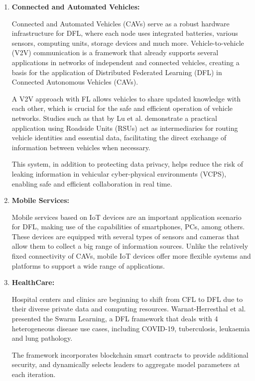 \begin{enumerate}
	\item \textbf{Connected and Automated Vehicles:}
	
	Connected and Automated Vehicles (CAVs) serve as a robust hardware infrastructure for DFL, where each node uses integrated batteries, various sensors, computing units, storage devices and much more. Vehicle-to-vehicle (V2V) communication is a framework that already supports several applications in networks of independent and connected vehicles, creating a basis for the application of Distributed Federated Learning (DFL) in Connected Autonomous Vehicles (CAVs). 
	
	A V2V approach with FL allows vehicles to share updated knowledge with each other, which is crucial for the safe and efficient operation of vehicle networks. Studies such as that by Lu et al. demonstrate a practical application using Roadside Units (RSUs) act as intermediaries for routing vehicle identities and essential data, facilitating the direct exchange of information between vehicles when necessary. 
	
	This system, in addition to protecting data privacy, helps reduce the risk of leaking information in vehicular cyber-physical environments (VCPS), enabling safe and efficient collaboration in real time.
	
	\item \textbf{Mobile Services:}
	
	Mobile services based on IoT devices are an important application scenario for \gls{DFL}, making use of the capabilities of smartphones, PCs, among others. These devices are equipped with several types of sensors and cameras that allow them to collect a big range of information sources. Unlike the relatively fixed connectivity of CAVs, mobile IoT devices offer more flexible systems and platforms to support a wide range of applications.
	
	\item \textbf{HealthCare:}
	
	Hospital centers and clinics are beginning to shift from \gls{CFL} to \gls{DFL} due to their diverse private data and computing resources. Warnat-Herresthal et al. presented the Swarm Learning, a \gls{DFL} framework that deals with 4 heterogeneous disease use cases, including COVID-19, tuberculosis, leukaemia and lung pathology. 
	
	The framework incorporates blockchain smart contracts to provide additional security, and dynamically selects leaders to aggregate model parameters at each iteration.
	

\end{enumerate}
